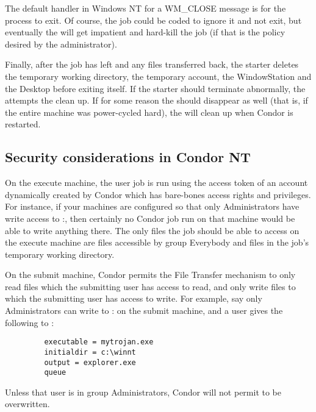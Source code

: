 \Note The default handler in Windows NT for a WM\_CLOSE message is for the
process to exit.  Of course, the job could be coded to ignore it and not
exit, but eventually the  will get impatient and hard-kill
the job (if that is the policy desired by the administrator).

Finally, after the job has left and any files transferred back,
the starter
deletes the temporary working directory, the temporary
account, the WindowStation and the Desktop before exiting itself.
If the starter should terminate abnormally, the 
attempts the clean up.
If for some reason the  should disappear as well
(that is, if the entire machine was power-cycled hard),
the  will clean up when Condor is restarted.

\subsection{Security considerations in Condor NT}


On the execute machine, the user job is run using the access token of an
account dynamically created by Condor which has bare-bones access rights and
privileges.  For instance, if your machines are configured so that only
Administrators have write access to
\verb@C:\WINNT@,
then certainly no
Condor job run on that machine would be able to write anything there.  The
only files the job should be able to access on the execute machine are files
accessible by group Everybody and files in the job's temporary working
directory.

On the submit machine, Condor permits the File Transfer mechanism to only
read files which the submitting user has access to read, and only write
files to which the submitting user has access to write.  For example, say
only Administrators can write to 
\verb@C:\WINNT@
on the submit machine,
and a user gives the following to  :
\begin{verbatim}
         executable = mytrojan.exe
         initialdir = c:\winnt
         output = explorer.exe
         queue
\end{verbatim}
Unless that user is in group Administrators, Condor will not permit
 to be overwritten.  

